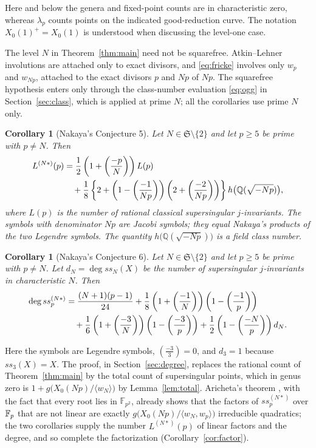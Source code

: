 \documentclass[11pt,a4paper]{article}
\newtheorem{corollary}[theorem]{Corollary}
\theoremstyle{remark}\newtheorem{remark}[theorem]{Remark}
\numberwithin{equation}{section}
\newcommand{\Q}{\mathbb Q}\newcommand{\Z}{\mathbb Z}
\newcommand{\leg}[2]{\left(\frac{#1}{#2}\right)}
\newcommand{\hK}[1]{h\bigl(\Q(\sqrt{-#1})\bigr)}
\begin{document}
	Here and below the genera and fixed-point counts are in characteristic zero, whereas $\lambda_p$ counts points on the indicated good-reduction curve. The notation $X_0(1)^+=X_0(1)$ is understood when discussing the level-one case.

	The level $N$ in Theorem~\ref{thm:main} need not be squarefree. Atkin--Lehner involutions are attached only to exact divisors, and \eqref{eq:fricke} involves only $w_p$ and $w_{Np}$, attached to the exact divisors $p$ and $Np$ of $Np$. The squarefree hypothesis enters only through the class-number evaluation \eqref{eq:ogg} in Section~\ref{sec:class}, which is applied at prime $N$; all the corollaries use prime $N$ only.
	
	\begin{corollary}[Nakaya's Conjecture 5]\label{cor:nakaya}
		Let $N\in\mathfrak S\setminus\{2\}$ and let $p\geq5$ be prime with $p\ne N$. Then
		\begin{align}
			L^{(N*)}(p)
			&=\frac12\left(1+\leg{-p}{N}\right)L(p)\notag\\
			&\quad+\frac18\left\{2+\left(1-\leg{-1}{Np}\right)
			\left(2+\leg{-2}{Np}\right)\right\}\hK{Np},\label{eq:nakaya}
		\end{align}
		where $L(p)$ is the number of rational classical supersingular $j$-invariants. The symbols with denominator $Np$ are Jacobi symbols; they equal Nakaya's products of the two Legendre symbols. The quantity $\hK{Np}$ is a field class number.
	\end{corollary}
	
	\begin{corollary}[Nakaya's Conjecture 6]\label{cor:degree}
		Let $N\in\mathfrak S\setminus\{2\}$ and let $p\geq5$ be prime with $p\ne N$. Let $d_N=\deg ss_N(X)$ be the number of supersingular $j$-invariants in characteristic $N$. Then
		\begin{align}
			\deg ss_p^{(N*)}
			&=\frac{(N+1)(p-1)}{24}
			+\frac18\left(1+\leg{-1}{N}\right)\left(1-\leg{-1}{p}\right)\notag\\
			&\quad+\frac16\left(1+\leg{-3}{N}\right)\left(1-\leg{-3}{p}\right)
			+\frac12\left(1-\leg{-N}{p}\right)d_N.\label{eq:C6}
		\end{align}
	\end{corollary}
	
	Here the symbols are Legendre symbols, $\leg{-3}{3}=0$, and $d_3=1$ because $ss_3(X)=X$. The proof, in Section~\ref{sec:degree}, replaces the rational count of Theorem~\ref{thm:main} by the total count of supersingular points, which in genus zero is $1+g\bigl(X_0(Np)/\langle w_N\rangle\bigr)$ by Lemma~\ref{lem:total}. Aricheta's theorem \cite[Theorem 3.1]{Aricheta}, with the fact that every root lies in $\mathbb F_{p^2}$, already shows that the factors of $ss_p^{(N*)}$ over $\mathbb F_p$ that are not linear are exactly $g\bigl(X_0(Np)/\langle w_N,w_p\rangle\bigr)$ irreducible quadratics; the two corollaries supply the number $L^{(N*)}(p)$ of linear factors and the degree, and so complete the factorization (Corollary~\ref{cor:factor}).
	
\end{document}
